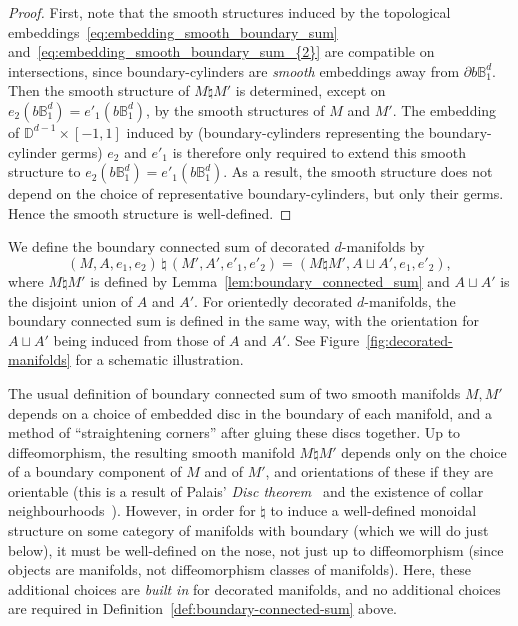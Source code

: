 \documentclass[AHL,Unicode,published]{cedram}
\newcommand{\bB}{\mathbb{B}}
\newcommand{\bD}{\mathbb{D}}
\begin{document}
\begin{proof}
First, note that the smooth structures induced by the topological embeddings~\eqref{eq:embedding_smooth_boundary_sum} and~\eqref{eq:embedding_smooth_boundary_sum_{2}} are compatible on intersections, since boundary-cylinders are \emph{smooth} embeddings away from $\partial b\bB^d_{1}$. Then the smooth structure of $M \natural M'$ is determined, except on $e_{2}(b\bB^d_{1}) = e'_{1}(b\bB^d_{1})$, by the smooth structures of $M$ and $M'$. The embedding of $\bD^{d-1} \times [-1,1]$ induced by (boundary-cylinders representing the boundary-cylinder germs) $e_{2}$ and $e'_{1}$ is therefore only required to extend this smooth structure to $e_{2}(b\bB^d_{1}) = e'_{1}(b\bB^d_{1})$. As a result, the smooth structure does not depend on the choice of representative boundary-cylinders, but only their germs. Hence the smooth structure is well-defined.
\end{proof}

\begin{defi}\label{def:boundary-connected-sum}
We define the boundary connected sum of decorated $d$-manifolds by
\[
(M,A,e_{1},e_{2}) \,\natural\, \left(M',A',e'_{1},e'_{2}\right) = \left(M \natural M',A\sqcup A',e_{1},e'_{2}\right),
\]
where $M \natural M'$ is defined by Lemma~\ref{lem:boundary_connected_sum} and $A\sqcup A'$ is the disjoint union of $A$ and $A'$. For orientedly decorated $d$-manifolds, the boundary connected sum is defined in the same way, with the orientation for $A \sqcup A'$ being induced from those of $A$ and $A'$. See Figure~\ref{fig:decorated-manifolds} for a schematic illustration.
\end{defi}

\begin{rema}\label{rmk:boundary_connected_sum_comparison}
The usual definition of boundary connected sum of two smooth manifolds $M,M'$ depends on a choice of embedded disc in the boundary of each manifold, and a method of ``straightening corners'' after gluing these discs together. Up to diffeomorphism, the resulting smooth manifold $M \natural M'$ depends only on the choice of a boundary component of $M$ and of $M'$, and orientations of these if they are orientable (this is a result of Palais' \emph{Disc theorem}~\cite[Th.~B and Cor.~1]{Palais1960Extendingdiffeomorphisms} and the existence of collar neighbourhoods~\cite{Brown1962}). However, in order for $\natural$ to induce a well-defined monoidal structure on some category of manifolds with boundary (which we will do just below), it must be well-defined on the nose, not just up to diffeomorphism (since objects are manifolds, not diffeomorphism classes of manifolds). Here, these additional choices are \emph{built in} for decorated manifolds, and no additional choices are required in Definition~\ref{def:boundary-connected-sum} above.
\end{rema}
\end{document}
